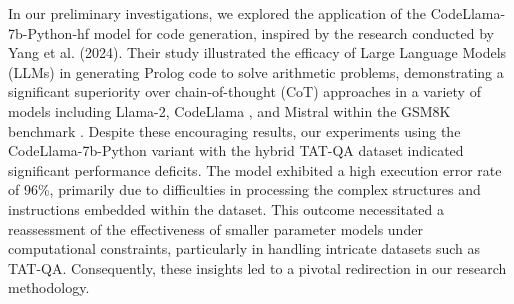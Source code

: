 \documentclass[logo,msc]{infthesis}           %
\begin{document}
In our preliminary investigations, we explored the application of the CodeLlama-7b-Python-hf model for code generation, inspired by the research conducted by Yang et al. (2024). Their study illustrated the efficacy of Large Language Models (LLMs) in generating Prolog code to solve arithmetic problems, demonstrating a significant superiority over chain-of-thought (CoT) approaches in a variety of models including Llama-2, CodeLlama \cite{rozière2024codellamaopenfoundation}, and Mistral within the GSM8K benchmark \cite{yang2024arithmeticreasoningllmprolog}. Despite these encouraging results, our experiments using the CodeLlama-7b-Python variant with the hybrid TAT-QA dataset indicated significant performance deficits. The model exhibited a high execution error rate of 96\%, primarily due to difficulties in processing the complex structures and instructions embedded within the dataset. This outcome necessitated a reassessment of the effectiveness of smaller parameter models under computational constraints, particularly in handling intricate datasets such as TAT-QA. Consequently, these insights led to a pivotal redirection in our research methodology.
\end{document}
